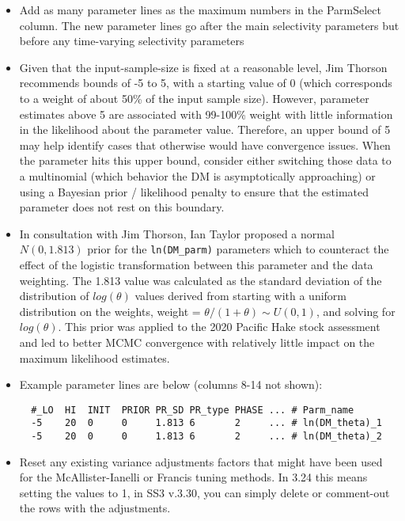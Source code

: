 \begin{itemize}
	\item Add as many parameter lines as the maximum numbers in the ParmSelect column. The new parameter lines go after the main selectivity parameters but before any time-varying selectivity parameters
	
\item Given that the input-sample-size is fixed at a reasonable level,
Jim Thorson recommends bounds of -5 to 5, with a starting value of 0
(which corresponds to a weight of about 50\% of the input sample size).
However, parameter estimates above 5 are associated with 99-100\% weight
with little information in the likelihood about the parameter value.
Therefore, an upper bound of 5 may help identify cases that otherwise
would have convergence issues.  When the parameter hits this upper
bound, consider either switching those data to a multinomial (which
behavior the DM is asymptotically approaching) or using a Bayesian prior
/ likelihood penalty to ensure that the estimated parameter does not
rest on this boundary.  	


\item In consultation with Jim Thorson, Ian Taylor proposed a normal
$N(0, 1.813)$ prior for the \texttt{ln(DM\_parm)} parameters which to
counteract the effect of the logistic transformation between this
parameter and the data weighting. The 1.813 value was calculated as the
standard deviation of the distribution of $log(\theta)$ values derived
from starting with a uniform distribution on the weights, weight =
$\theta/(1+\theta) \sim U(0,1)$, and solving for $log(\theta)$. This
prior was applied to the 2020 Pacific Hake stock assessment
\citep{grandin-status-2020} and led to better MCMC convergence with
relatively little impact on the maximum likelihood estimates. 
	
\item Example parameter lines are below (columns 8-14 not shown): 
    \begin{small}
      \begin{minipage}{\linewidth} 
\begin{verbatim}
  #_LO  HI  INIT  PRIOR PR_SD PR_type PHASE ... # Parm_name
  -5    20  0     0     1.813 6       2     ... # ln(DM_theta)_1
  -5    20  0     0     1.813 6       2     ... # ln(DM_theta)_2
\end{verbatim}
      \end{minipage}
    \end{small}
	
\item Reset any existing variance adjustments factors that might have been used for the McAllister-Ianelli or Francis tuning methods. In 3.24 this means setting the values to 1, in SS3 v.3.30, you can simply delete or comment-out the rows with the adjustments.
\end{itemize}

